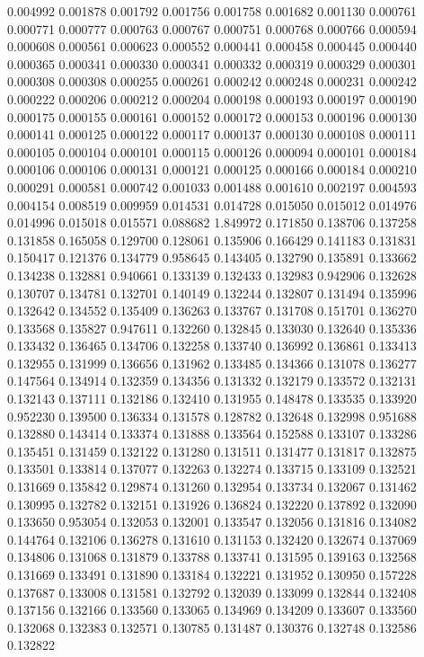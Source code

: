 0.004992
0.001878
0.001792
0.001756
0.001758
0.001682
0.001130
0.000761
0.000771
0.000777
0.000763
0.000767
0.000751
0.000768
0.000766
0.000594
0.000608
0.000561
0.000623
0.000552
0.000441
0.000458
0.000445
0.000440
0.000365
0.000341
0.000330
0.000341
0.000332
0.000319
0.000329
0.000301
0.000308
0.000308
0.000255
0.000261
0.000242
0.000248
0.000231
0.000242
0.000222
0.000206
0.000212
0.000204
0.000198
0.000193
0.000197
0.000190
0.000175
0.000155
0.000161
0.000152
0.000172
0.000153
0.000196
0.000130
0.000141
0.000125
0.000122
0.000117
0.000137
0.000130
0.000108
0.000111
0.000105
0.000104
0.000101
0.000115
0.000126
0.000094
0.000101
0.000184
0.000106
0.000106
0.000131
0.000121
0.000125
0.000166
0.000184
0.000210
0.000291
0.000581
0.000742
0.001033
0.001488
0.001610
0.002197
0.004593
0.004154
0.008519
0.009959
0.014531
0.014728
0.015050
0.015012
0.014976
0.014996
0.015018
0.015571
0.088682
1.849972
0.171850
0.138706
0.137258
0.131858
0.165058
0.129700
0.128061
0.135906
0.166429
0.141183
0.131831
0.150417
0.121376
0.134779
0.958645
0.143405
0.132790
0.135891
0.133662
0.134238
0.132881
0.940661
0.133139
0.132433
0.132983
0.942906
0.132628
0.130707
0.134781
0.132701
0.140149
0.132244
0.132807
0.131494
0.135996
0.132642
0.134552
0.135409
0.136263
0.133767
0.131708
0.151701
0.136270
0.133568
0.135827
0.947611
0.132260
0.132845
0.133030
0.132640
0.135336
0.133432
0.136465
0.134706
0.132258
0.133740
0.136992
0.136861
0.133413
0.132955
0.131999
0.136656
0.131962
0.133485
0.134366
0.131078
0.136277
0.147564
0.134914
0.132359
0.134356
0.131332
0.132179
0.133572
0.132131
0.132143
0.137111
0.132186
0.132410
0.131955
0.148478
0.133535
0.133920
0.952230
0.139500
0.136334
0.131578
0.128782
0.132648
0.132998
0.951688
0.132880
0.143414
0.133374
0.131888
0.133564
0.152588
0.133107
0.133286
0.135451
0.131459
0.132122
0.131280
0.131511
0.131477
0.131817
0.132875
0.133501
0.133814
0.137077
0.132263
0.132274
0.133715
0.133109
0.132521
0.131669
0.135842
0.129874
0.131260
0.132954
0.133734
0.132067
0.131462
0.130995
0.132782
0.132151
0.131926
0.136824
0.132220
0.137892
0.132090
0.133650
0.953054
0.132053
0.132001
0.133547
0.132056
0.131816
0.134082
0.144764
0.132106
0.136278
0.131610
0.131153
0.132420
0.132674
0.137069
0.134806
0.131068
0.131879
0.133788
0.133741
0.131595
0.139163
0.132568
0.131669
0.133491
0.131890
0.133184
0.132221
0.131952
0.130950
0.157228
0.137687
0.133008
0.131581
0.132792
0.132039
0.133099
0.132844
0.132408
0.137156
0.132166
0.133560
0.133065
0.134969
0.134209
0.133607
0.133560
0.132068
0.132383
0.132571
0.130785
0.131487
0.130376
0.132748
0.132586
0.132822
